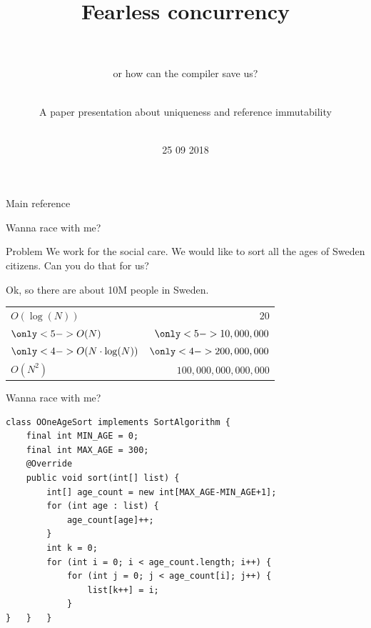 \documentclass[handout]{beamer} %
\title{\centering Fearless concurrency \\ ~}
\subtitle{ or how can the compiler save us?}
\author{\centering ~ \\ A paper presentation about uniqueness and reference immutability \\ ~}
\institute{Thomas Lacroix \\ KTH -- Pardis 18}
\date{25 09 2018}
\begin{document}

\begin{frame}
    \maketitle
\end{frame}


\begin{frame}{Main reference}
    \nocite{*}
    
    
\end{frame}


\begin{frame}{Wanna race with me?}
	\begin{block}{Problem}
	We work for the social care. We would like to sort all the ages of Sweden
	citizens. Can you do that for us?
	\end{block}
	\vfill\pause
	Ok, so there are about 10M people in Sweden.
	\vfill\pause
	\centering
	\newcommand{\blue}{\only<4->{\color{blue}}}
	\newcommand{\green}{\only<5->{\color{dkgreen}}}
	\begin{tabular}{|l|r|}
		\hline
		$ O(\log(N))               $ & $                  20 $ \\
		$ \green O(N)              $ & $ \green   10,000,000 $ \\
		$ \blue O(N \cdot \log(N)) $ & $ \blue   200,000,000 $ \\
		$ O(N^2)                   $ & $ 100,000,000,000,000 $ \\
		\hline
	\end{tabular}
\end{frame}


\begin{frame}[fragile]{Wanna race with me?}
	\begin{lstlisting}
class OOneAgeSort implements SortAlgorithm {
    final int MIN_AGE = 0;
    final int MAX_AGE = 300;
    @Override
    public void sort(int[] list) {
        int[] age_count = new int[MAX_AGE-MIN_AGE+1];
        for (int age : list) {
            age_count[age]++;
        }
        int k = 0;
        for (int i = 0; i < age_count.length; i++) {
            for (int j = 0; j < age_count[i]; j++) {
                list[k++] = i;
            }
}   }   }
	\end{lstlisting}
\end{frame}
\end{document}
